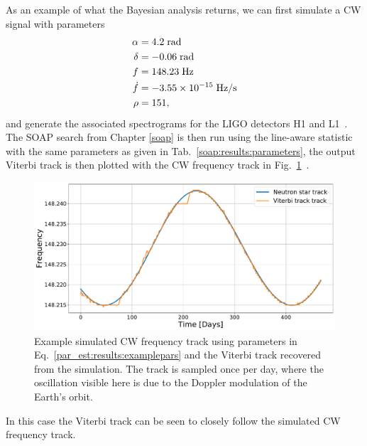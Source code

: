 As an example of what the Bayesian analysis returns, we can first simulate a \gls{CW} signal with
parameters 
%
\begin{equation}
    \label{par_est:results:examplepars}
    \begin{split}
        \alpha &= 4.2 \; \rm{rad}\\
        \delta &= -0.06 \; \rm{rad} \\
        f &= 148.23 \; \rm{Hz}\\
        \dot{f} &= -3.55 \times 10^{-15} \; \rm{Hz/s} \\
        \rho &= 151,\\
    \end{split}
\end{equation}
%
and generate the associated spectrograms for the \gls{LIGO} detectors H1 and
L1~. The SOAP search from
Chapter \ref{soap} is then run using the line-aware statistic with the same
parameters as given in Tab.~\ref{soap:results:parameters}, the output Viterbi track is then plotted with the \gls{CW}
frequency track in Fig.~\ref{par_est:results:freqtrack}~. 
%
\begin{figure}[ht]
    \centering
    \includegraphics[width=\linewidth]{C5_parameter/example_freqtrack.pdf}
    \caption[Frequency track of injected signal]{ Example simulated \gls{CW}
frequency track using parameters in Eq.~\ref{par_est:results:examplepars} and the
Viterbi track recovered from the simulation. The track is sampled once per day,
where the oscillation visible here is due to the Doppler modulation of the
Earth's orbit.~} \label{par_est:results:freqtrack}    
\end{figure}
%
In this case the Viterbi track can be seen to closely follow the simulated
\gls{CW} frequency track.

